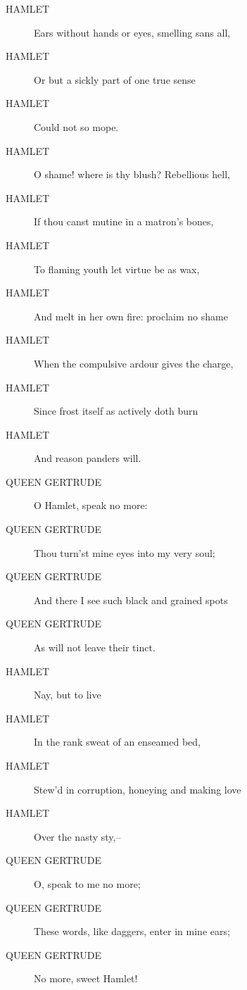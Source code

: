 \documentclass{article}
\begin{document}
\begin{description}
\item[HAMLET] Ears without hands or eyes, smelling sans all,
\item[HAMLET] Or but a sickly part of one true sense
\item[HAMLET] Could not so mope.
\item[HAMLET] O shame! where is thy blush? Rebellious hell,
\item[HAMLET] If thou canst mutine in a matron's bones,
\item[HAMLET] To flaming youth let virtue be as wax,
\item[HAMLET] And melt in her own fire: proclaim no shame
\item[HAMLET] When the compulsive ardour gives the charge,
\item[HAMLET] Since frost itself as actively doth burn
\item[HAMLET] And reason panders will.
\end{description}
          
\begin{description}
            
\item[QUEEN GERTRUDE] O Hamlet, speak no more:
\item[QUEEN GERTRUDE] Thou turn'st mine eyes into my very soul;
\item[QUEEN GERTRUDE] And there I see such black and grained spots
\item[QUEEN GERTRUDE] As will not leave their tinct.
\end{description}
          
\begin{description}
            
\item[HAMLET] Nay, but to live
\item[HAMLET] In the rank sweat of an enseamed bed,
\item[HAMLET] Stew'd in corruption, honeying and making love
\item[HAMLET] Over the nasty sty,--
\end{description}
          
\begin{description}
            
\item[QUEEN GERTRUDE] O, speak to me no more;
\item[QUEEN GERTRUDE] These words, like daggers, enter in mine ears;
\item[QUEEN GERTRUDE] No more, sweet Hamlet!
\end{description}
          
\end{document}

